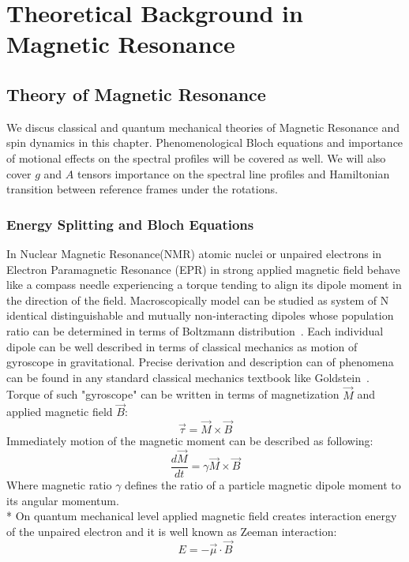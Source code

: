 \chapter{Theoretical Background in Magnetic Resonance}
\section{Theory of Magnetic Resonance}
We discus classical and quantum mechanical theories of Magnetic Resonance and spin dynamics in this chapter. Phenomenological Bloch equations and importance of motional effects on the spectral profiles will be covered as well. We will also cover $g$ and $A$ tensors importance on the spectral line profiles and Hamiltonian transition between reference frames under the rotations. 
\subsection{Energy Splitting and Bloch Equations}\label{blochsection}
In Nuclear Magnetic Resonance(NMR) atomic nuclei or unpaired electrons in Electron Paramagnetic Resonance (EPR) in strong applied magnetic field behave like a compass needle experiencing a torque tending to align its dipole moment in the direction of the field. Macroscopically model can be studied as system of N identical distinguishable and mutually non-interacting dipoles whose population ratio can be determined in terms of Boltzmann distribution~\cite{pathria}. Each individual dipole can be well described in terms of classical mechanics as motion of gyroscope in gravitational. Precise derivation and description can of phenomena can be found in any standard classical mechanics textbook like Goldstein~\cite{gold}. Torque of such "gyroscope" can be written in terms of magnetization $\vec{M}$ and applied magnetic field $\vec{B}$:
\begin{equation}\label{eq:torque}
\vec{\tau}=\vec{M}\times\vec{B}
\end{equation}
Immediately motion of the magnetic moment can be described as following: 
\begin{equation}\label{eq:torque2}
\frac{d\vec{M}}{dt}=\gamma\vec{M}\times\vec{B}
\end{equation}
Where magnetic ratio $\gamma$ defines the ratio of a particle magnetic dipole moment to its angular momentum.\\*
On quantum mechanical level applied magnetic field creates interaction energy of the unpaired electron and it is well known as Zeeman interaction: 
\begin{equation}\label{eq:1}
E = - \vec{\mu}\cdot \vec{B}
\end{equation}  
